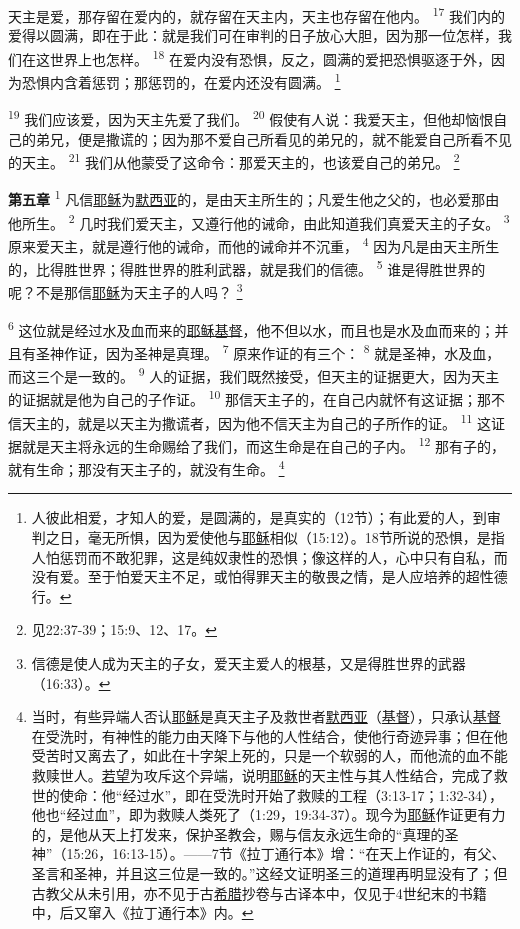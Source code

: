天主是爱，那存留在爱内的，就存留在天主内，天主也存留在他内。
\textsuperscript{17}
我们内的爱得以圆满，即在于此：就是我们可在审判的日子放心大胆，因为那一位怎样，我们在这世界上也怎样。
\textsuperscript{18}
在爱内没有恐惧，反之，圆满的爱把恐惧驱逐于外，因为恐惧内含着惩罚；那惩罚的，在爱内还没有圆满。
\footnote{人彼此相爱，才知人的爱，是圆满的，是真实的（12节）；有此爱的人，到审判之日，毫无所惧，因为爱使他与\uline{耶稣}相似（15:12）。18节所说的恐惧，是指人怕惩罚而不敢犯罪，这是纯奴隶性的恐惧；像这样的人，心中只有自私，而没有爱。至于怕爱天主不足，或怕得罪天主的敬畏之情，是人应培养的超性德行。}

\textsuperscript{19}
我们应该爱，因为天主先爱了我们。
\textsuperscript{20}
假使有人说：我爱天主，但他却恼恨自己的弟兄，便是撒谎的；因为那不爱自己所看见的弟兄的，就不能爱自己所看不见的天主。
\textsuperscript{21}
我们从他蒙受了这命令：那爱天主的，也该爱自己的弟兄。
\footnote{见22:37-39；15:9、12、17。}

\textbf{第五章\quad}
\textsuperscript{1}
凡信\uline{耶稣}为\uline{默西亚}的，是由天主所生的；凡爱生他之父的，也必爱那由他所生。
\textsuperscript{2}
几时我们爱天主，又遵行他的诫命，由此知道我们真爱天主的子女。
\textsuperscript{3}
原来爱天主，就是遵行他的诫命，而他的诫命并不沉重，
\textsuperscript{4}
因为凡是由天主所生的，比得胜世界；得胜世界的胜利武器，就是我们的信德。
\textsuperscript{5}
谁是得胜世界的呢？不是那信\uline{耶稣}为天主子的人吗？
\footnote{信德是使人成为天主的子女，爱天主爱人的根基，又是得胜世界的武器（16:33）。}

\textsuperscript{6}
这位就是经过水及血而来的\uline{耶稣}\uline{基督}，他不但以水，而且也是水及血而来的；并且有圣神作证，因为圣神是真理。
\textsuperscript{7}
原来作证的有三个：
\textsuperscript{8}
就是圣神，水及血，而这三个是一致的。
\textsuperscript{9}
人的证据，我们既然接受，但天主的证据更大，因为天主的证据就是他为自己的子作证。
\textsuperscript{10}
那信天主子的，在自己内就怀有这证据；那不信天主的，就是以天主为撒谎者，因为他不信天主为自己的子所作的证。
\textsuperscript{11}
这证据就是天主将永远的生命赐给了我们，而这生命是在自己的子内。
\textsuperscript{12}
那有子的，就有生命；那没有天主子的，就没有生命。
\footnote{当时，有些异端人否认\uline{耶稣}是真天主子及救世者\uline{默西亚}（\uline{基督}），只承认\uline{基督}在受洗时，有神性的能力由天降下与他的人性结合，使他行奇迹异事；但在他受苦时又离去了，如此在十字架上死的，只是一个软弱的人，而他流的血不能救赎世人。\uline{若望}为攻斥这个异端，说明\uline{耶稣}的天主性与其人性结合，完成了救世的使命：他“经过水”，即在受洗时开始了救赎的工程（3:13-17；1:32-34），他也“经过血”，即为救赎人类死了（1:29，19:34-37）。现今为\uline{耶稣}作证更有力的，是他从天上打发来，保护圣教会，赐与信友永远生命的“真理的圣神”（15:26，16:13-15）。——7节《拉丁通行本》增：“在天上作证的，有父、圣言和圣神，并且这三位是一致的。”这经文证明圣三的道理再明显没有了；但古教父从未引用，亦不见于古\uline{希腊}抄卷与古译本中，仅见于4世纪末的书籍中，后又窜入《拉丁通行本》内。}

